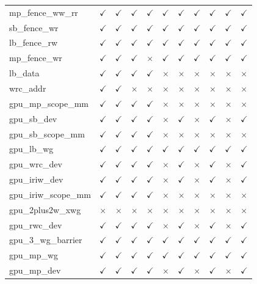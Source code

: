 \documentclass[10pt]{article}
\newcommand{\cmark}{$\checkmark$}
\newcommand{\xmark}{$\times$}
\begin{document}
{\begin{table}[p]
\begin{tabular}{l cccc cccccc}
mp\_fence\_ww\_rr & \cmark & \cmark & \cmark & \cmark & \cmark & \cmark & \cmark & \cmark & \cmark & \cmark \\
sb\_fence\_wr & \cmark & \cmark & \cmark & \cmark & \cmark & \cmark & \cmark & \cmark & \cmark & \cmark \\
lb\_fence\_rw & \cmark & \cmark & \cmark & \cmark & \cmark & \cmark & \cmark & \cmark & \cmark & \cmark \\
mp\_fence\_wr & \cmark & \cmark & \cmark & \xmark & \cmark & \cmark & \cmark & \cmark & \cmark & \cmark \\
lb\_data & \cmark & \cmark & \cmark & \cmark & \xmark & \xmark & \xmark & \xmark & \xmark & \xmark \\
wrc\_addr & \cmark & \cmark & \xmark & \xmark & \xmark & \xmark & \xmark & \xmark & \xmark & \xmark \\
gpu\_mp\_scope\_mm & \cmark & \cmark & \cmark & \cmark & \xmark & \xmark & \xmark & \xmark & \xmark & \xmark \\
gpu\_sb\_dev & \cmark & \cmark & \cmark & \cmark & \xmark & \cmark & \xmark & \cmark & \xmark & \cmark \\
gpu\_sb\_scope\_mm & \cmark & \cmark & \cmark & \cmark & \xmark & \xmark & \xmark & \xmark & \xmark & \xmark \\
gpu\_lb\_wg & \cmark & \cmark & \cmark & \cmark & \cmark & \cmark & \cmark & \cmark & \cmark & \cmark \\
gpu\_wrc\_dev & \cmark & \cmark & \cmark & \cmark & \xmark & \cmark & \xmark & \cmark & \xmark & \cmark \\
gpu\_iriw\_dev & \cmark & \cmark & \cmark & \cmark & \xmark & \cmark & \xmark & \cmark & \xmark & \cmark \\
gpu\_iriw\_scope\_mm & \cmark & \cmark & \cmark & \cmark & \xmark & \xmark & \xmark & \xmark & \xmark & \xmark \\
gpu\_2plus2w\_xwg & \xmark & \xmark & \xmark & \xmark & \xmark & \xmark & \xmark & \xmark & \xmark & \xmark \\
gpu\_rwc\_dev & \cmark & \cmark & \cmark & \cmark & \xmark & \cmark & \xmark & \cmark & \xmark & \cmark \\
gpu\_3\_wg\_barrier & \cmark & \cmark & \cmark & \cmark & \cmark & \cmark & \cmark & \cmark & \cmark & \cmark \\
gpu\_mp\_wg & \cmark & \cmark & \cmark & \cmark & \cmark & \cmark & \cmark & \cmark & \cmark & \cmark \\
gpu\_mp\_dev & \cmark & \cmark & \cmark & \cmark & \xmark & \cmark & \xmark & \cmark & \xmark & \cmark \\

\end{tabular}
\end{table}}
\end{document}
